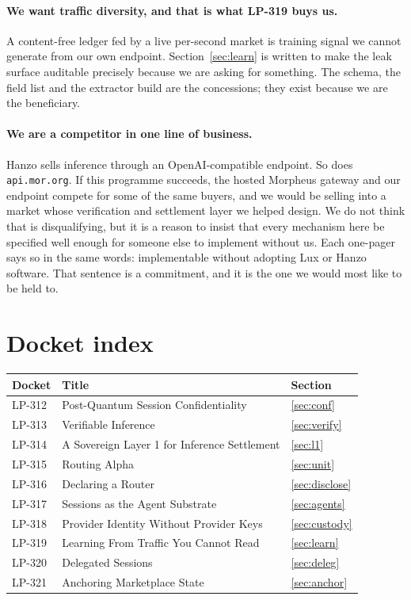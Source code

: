 \documentclass[11pt,a4paper]{article}
\newcommand{\code}[1]{\texttt{\small #1}}
\begin{document}
\paragraph{We want traffic diversity, and that is what LP-319 buys us.} A
content-free ledger fed by a live per-second market is training signal we cannot
generate from our own endpoint. Section~\ref{sec:learn} is written to make the
leak surface auditable precisely because we are asking for something. The
schema, the field list and the extractor build are the concessions; they exist
because we are the beneficiary.

\paragraph{We are a competitor in one line of business.} Hanzo sells inference
through an OpenAI-compatible endpoint. So does \code{api.mor.org}. If this
programme succeeds, the hosted Morpheus gateway and our endpoint compete for
some of the same buyers, and we would be selling into a market whose verification
and settlement layer we helped design. We do not think that is disqualifying, but
it is a reason to insist that every mechanism here be specified well enough for
someone else to implement without us. Each one-pager says so in the same words:
implementable without adopting Lux or Hanzo software. That sentence is a
commitment, and it is the one we would most like to be held to.

\section{Docket index}

\begin{center}
\begin{tabular}{@{}lll@{}}
\toprule
\textbf{Docket} & \textbf{Title} & \textbf{Section} \\
\midrule
LP-312 & Post-Quantum Session Confidentiality & \ref{sec:conf} \\
LP-313 & Verifiable Inference & \ref{sec:verify} \\
LP-314 & A Sovereign Layer 1 for Inference Settlement & \ref{sec:l1} \\
LP-315 & Routing Alpha & \ref{sec:unit} \\
LP-316 & Declaring a Router & \ref{sec:disclose} \\
LP-317 & Sessions as the Agent Substrate & \ref{sec:agents} \\
LP-318 & Provider Identity Without Provider Keys & \ref{sec:custody} \\
LP-319 & Learning From Traffic You Cannot Read & \ref{sec:learn} \\
LP-320 & Delegated Sessions & \ref{sec:deleg} \\
LP-321 & Anchoring Marketplace State & \ref{sec:anchor} \\
\bottomrule
\end{tabular}
\end{center}
\end{document}
